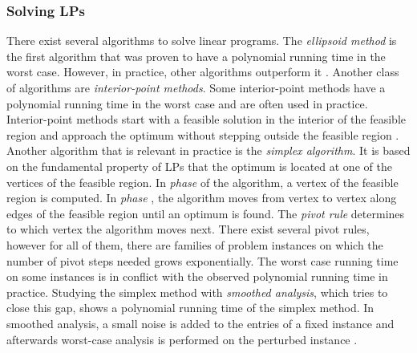 \subsubsection{Solving LPs} \label{section:solving_lps}
There exist several algorithms to solve linear programs. The \textit{ellipsoid method} is the first algorithm that was proven to have a polynomial running time in the worst case. However, in practice, other algorithms outperform it \cite{understanding_lp}. Another class of algorithms are \textit{interior-point methods}. Some interior-point methods have a polynomial running time in the worst case and are often used in practice. Interior-point methods start with a feasible solution in the interior of the feasible region and approach the optimum without stepping outside the feasible region \cite{understanding_lp}. \\
Another algorithm that is relevant in practice is the \textit{simplex algorithm}. It is based on the fundamental property of LPs that the optimum is located at one of the vertices of the feasible region. %
In \textit{phase } of the algorithm, a vertex of the feasible region is computed. In \textit{phase }, the algorithm moves from vertex to vertex along edges of the feasible region until an optimum is found. The \textit{pivot rule} determines to which vertex the algorithm moves next. There exist several pivot rules, however for all of them, there are families of problem instances on which the number of pivot steps needed grows exponentially. The worst case running time on some instances is in conflict with the observed polynomial running time in practice. Studying the simplex method with \textit{smoothed analysis}, which tries to close this gap, shows a polynomial running time of the simplex method. In smoothed analysis, a small noise is added to the entries of a fixed instance and afterwards worst-case analysis is performed on the perturbed instance \cite{huiberts,dadush}.

